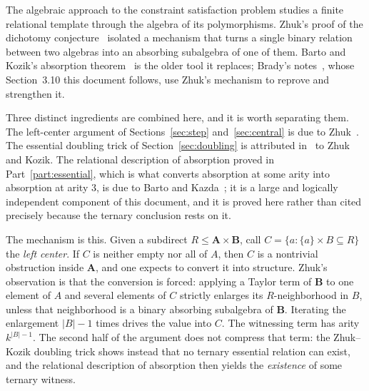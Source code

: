 \documentclass[11pt]{article}
\theoremstyle{mainplain}
\theoremstyle{mainroman}
\theoremstyle{definition}
\numberwithin{equation}{section}
\newcommand{\bA}{\mathbf A}
\newcommand{\bB}{\mathbf B}
\begin{document}
The algebraic approach to the constraint satisfaction problem studies a
finite relational template through the algebra of its polymorphisms. Zhuk's
proof of the dichotomy conjecture~\cite{Zhuk} isolated a mechanism that turns a
single binary relation between two algebras into an absorbing subalgebra of one
of them. Barto and Kozik's absorption theorem~\cite{BartoKozikCyclic} is the
older tool it replaces; Brady's notes~\cite{BradyNotes}, whose Section~3.10 this
document follows, use Zhuk's mechanism to reprove and strengthen it.

Three distinct ingredients are combined here, and it is worth separating them.
The left-center argument of Sections~\ref{sec:step} and~\ref{sec:central} is due
to Zhuk~\cite{Zhuk}. The essential doubling trick of
Section~\ref{sec:doubling} is attributed in~\cite{BradyNotes} to Zhuk and
Kozik. The relational description of absorption proved in
Part~\ref{part:essential}, which is what converts absorption at some arity into
absorption at arity $3$, is due to Barto and Kazda~\cite{BartoKazda}; it is a
large and logically independent component of this document, and it is proved
here rather than cited precisely because the ternary conclusion rests on it.

The mechanism is this. Given a subdirect $R\le\bA\times\bB$, call
$C=\{a: \{a\}\times B\subseteq R\}$ the \emph{left center}. If $C$ is neither
empty nor all of $A$, then $C$ is a nontrivial obstruction inside $\bA$, and one
expects to convert it into structure. Zhuk's observation is that the conversion
is forced: applying a Taylor term of $\bB$ to one element of $A$ and several
elements of $C$ strictly enlarges its $R$-neighborhood in $B$, unless that
neighborhood is a binary absorbing subalgebra of $\bB$. Iterating the
enlargement $|B|-1$ times drives the value into $C$. The witnessing term has
arity $k^{|B|-1}$. The second half of the argument does not compress that term:
the Zhuk--Kozik doubling trick shows instead that no ternary essential relation
can exist, and the relational description of absorption then yields the
\emph{existence} of some ternary witness.

\medskip
\end{document}
